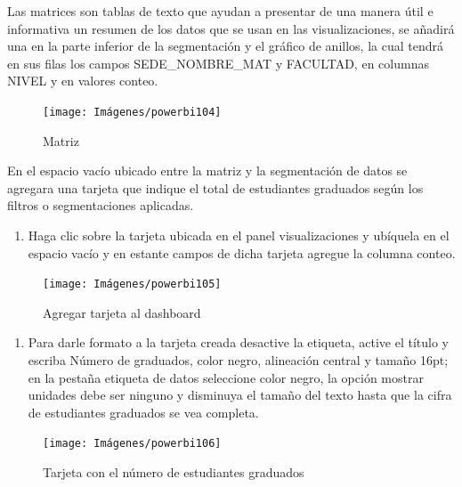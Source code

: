 \documentclass[
]{book}
\providecommand{\tightlist}{%
  \setlength{\itemsep}{0pt}\setlength{\parskip}{0pt}}
\begin{document}
Las matrices son tablas de texto que ayudan a presentar de una manera útil e informativa un resumen de los datos que se usan en las visualizaciones, se añadirá una en la parte inferior de la segmentación y el gráfico de anillos, la cual tendrá en sus filas los campos SEDE\_NOMBRE\_MAT y FACULTAD, en columnas NIVEL y en valores conteo.

\begin{figure}

{\centering \texttt{[image: Imágenes/powerbi104]} 

}

\caption{Matriz}\label{fig:matrizparanivel-fig}
\end{figure}

En el espacio vacío ubicado entre la matriz y la segmentación de datos se agregara una tarjeta que indique el total de estudiantes graduados según los filtros o segmentaciones aplicadas.

\begin{enumerate}
\def\labelenumi{\arabic{enumi}.}
\tightlist
\item
  Haga clic sobre la tarjeta ubicada en el panel visualizaciones y ubíquela en el espacio vacío y en estante campos de dicha tarjeta agregue la columna conteo.
\end{enumerate}

\begin{figure}

{\centering \texttt{[image: Imágenes/powerbi105]} 

}

\caption{Agregar tarjeta al dashboard}\label{fig:paso1tarjeta-fig}
\end{figure}

\begin{enumerate}
\def\labelenumi{\arabic{enumi}.}
\setcounter{enumi}{1}
\tightlist
\item
  Para darle formato a la tarjeta creada desactive la etiqueta, active el título y escriba Número de graduados, color negro, alineación central y tamaño 16pt; en la pestaña etiqueta de datos seleccione color negro, la opción mostrar unidades debe ser ninguno y disminuya el tamaño del texto hasta que la cifra de estudiantes graduados se vea completa.
\end{enumerate}

\begin{figure}

{\centering \texttt{[image: Imágenes/powerbi106]} 

}

\caption{Tarjeta con el número de estudiantes graduados}\label{fig:paso2tarjeta-fig}
\end{figure}
\end{document}
